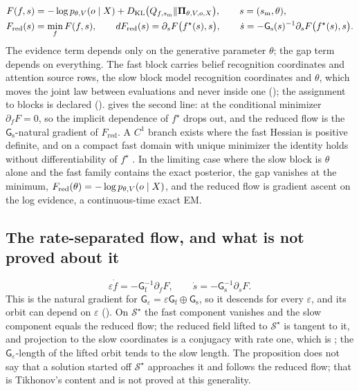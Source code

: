 \begin{align*}
F(f,s)&=-\log p_{\theta,V}(o\mid X)
+D_{\mathrm{KL}}\bigl(Q_{f,s_{\mathrm m}}\Vert\boldsymbol\Pi_{\theta,V,o,X}\bigr),
\qquad s=(s_{\mathrm m},\theta),
\\
F_{\mathrm{red}}(s)&=\min_fF(f,s),
\qquad
dF_{\mathrm{red}}(s)=\partial_sF\bigl(f^\star(s),s\bigr),
\qquad
\dot s=-\mathsf G_{\mathrm s}(s)^{-1}\partial_sF\bigl(f^\star(s),s\bigr).
\end{align*}
The evidence term depends only on the generative parameter $\theta$; the gap term depends on
everything. The fast block carries belief recognition coordinates and attention source rows, the slow
block model recognition coordinates and $\theta$, which moves the joint law between evaluations and
never inside one (); the assignment to blocks is declared
().  gives the second line: at the
conditional minimizer $\partial_fF=0$, so the implicit dependence of $f^\star$ drops out, and the
reduced flow is the $\mathsf G_{\mathrm s}$-natural gradient of $F_{\mathrm{red}}$. A $C^1$ branch
exists where the fast Hessian is positive definite, and on a compact fast domain with unique minimizer
the identity holds without differentiability of $f^\star$ \citep{Danskin1967}. In the limiting case
where the slow block is $\theta$ alone and the fast family contains the exact posterior, the gap
vanishes at the minimum, $F_{\mathrm{red}}(\theta)=-\log p_{\theta,V}(o\mid X)$, and the reduced
flow is gradient ascent on the log evidence, a continuous-time exact EM.

\subsection{The rate-separated flow, and what is not proved about it}
\label{comp:ch08-formulas-rate}

\[
\varepsilon\dot f=-\mathsf G_{\mathrm f}^{-1}\partial_fF,
\qquad
\dot s=-\mathsf G_{\mathrm s}^{-1}\partial_sF .
\]
This is the natural gradient for $\mathsf G_\varepsilon=\varepsilon\mathsf G_{\mathrm f}\oplus
\mathsf G_{\mathrm s}$, so it descends for every $\varepsilon$, and its orbit can depend on
$\varepsilon$ (). On $\mathcal S^\star$ the fast component vanishes
and the slow component equals the reduced flow; the reduced field lifted to $\mathcal S^\star$ is
tangent to it, and projection to the slow coordinates is a conjugacy with rate one, which is
; the $\mathsf G_\varepsilon$-length of the lifted orbit tends to
the slow length. The proposition does not say that a solution started off $\mathcal S^\star$ approaches
it and follows the reduced flow; that is Tikhonov's content and is not proved at this generality.

